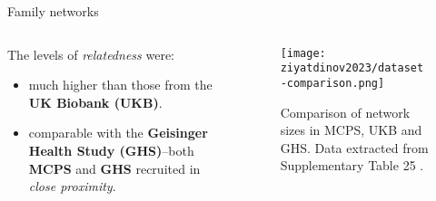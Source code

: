 \begin{frame}{Family networks}
    \begin{columns}
        \begin{column}{0.5\textwidth}

            The levels of \textit{relatedness} were:
            \begin{itemize}
                \item much higher than those from the \textbf{UK Biobank (UKB)}.
                \item comparable with the \textbf{Geisinger Health Study (GHS)}--both \textbf{MCPS} and \textbf{GHS} recruited in \textit{close proximity}.
            \end{itemize}
        \end{column}

        \begin{column}{0.5\textwidth}
            \begin{figure}[htpb]
                \centering
                \texttt{[image: ziyatdinov2023/dataset-comparison.png]}
                \caption{Comparison of network sizes in MCPS, UKB and GHS. Data extracted from Supplementary Table 25 \parencite{ziyatdinov2023}.}
                \label{fig:ziyatdinov2023-nrelationships-comparison}
            \end{figure}
        \end{column}
    \end{columns}
\end{frame}

